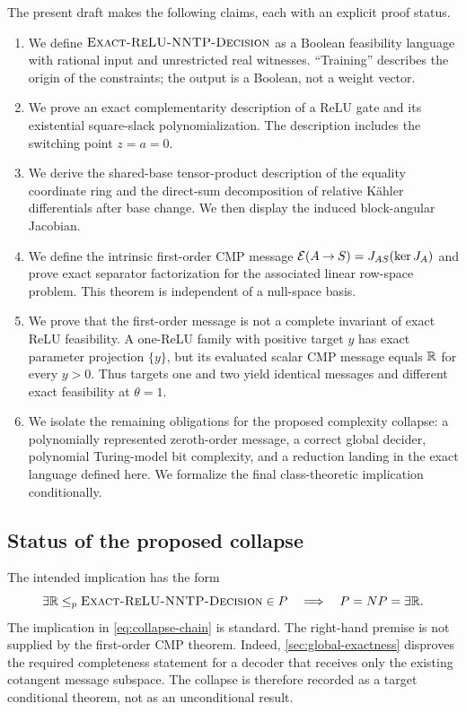 The present draft makes the following claims, each with an explicit proof
status.

\begin{enumerate}
  \item We define \(\textnormal{\textsc{Exact-ReLU-NNTP-Decision}}\) as a Boolean feasibility language with
  rational input and unrestricted real witnesses.  ``Training'' describes the
  origin of the constraints; the output is a Boolean, not a weight vector.

  \item We prove an exact complementarity description of a ReLU gate and its
  existential square-slack polynomialization.  The description includes the
  switching point \(z=a=0\).

  \item We derive the shared-base tensor-product description of the equality
  coordinate ring and the direct-sum decomposition of relative K\"ahler
  differentials after base change.  We then display the induced block-angular
  Jacobian.

  \item We define the intrinsic first-order CMP message
  \(
    \mathcal{E}(A\mathbin{\to}S)=J_{AS}(\operatorname{ker} J_A)
  \)
  and prove exact separator factorization for the associated linear row-space
  problem.  This theorem is independent of a null-space basis.

  \item We prove that the first-order message is not a complete invariant of
  exact ReLU feasibility.  A one-ReLU family with positive target \(y\) has
  exact parameter projection \(\{y\}\), but its evaluated scalar CMP message
  equals \(\mathbb{R}\) for every \(y>0\).  Thus targets one and two yield identical
  messages and different exact feasibility at \(\theta=1\).

  \item We isolate the remaining obligations for the proposed complexity
  collapse: a polynomially represented zeroth-order message, a correct global
  decider, polynomial Turing-model bit complexity, and a reduction landing in
  the exact language defined here.  We formalize the final class-theoretic
  implication conditionally.
\end{enumerate}

\subsection{Status of the proposed collapse}

The intended implication has the form
\begin{equation}
  \exists\mathbb{R} \leq_p \textnormal{\textsc{Exact-ReLU-NNTP-Decision}} \in P
  \quad\Longrightarrow\quad
  P=NP=\exists\mathbb{R}.
  \label{eq:collapse-chain}
\end{equation}
The implication in \cref{eq:collapse-chain} is standard.  The right-hand
premise is not supplied by the first-order CMP theorem.  Indeed,
\cref{sec:global-exactness} disproves the required completeness statement for
a decoder that receives only the existing cotangent message subspace.  The
collapse is therefore recorded as a target conditional theorem, not as an
unconditional result.

